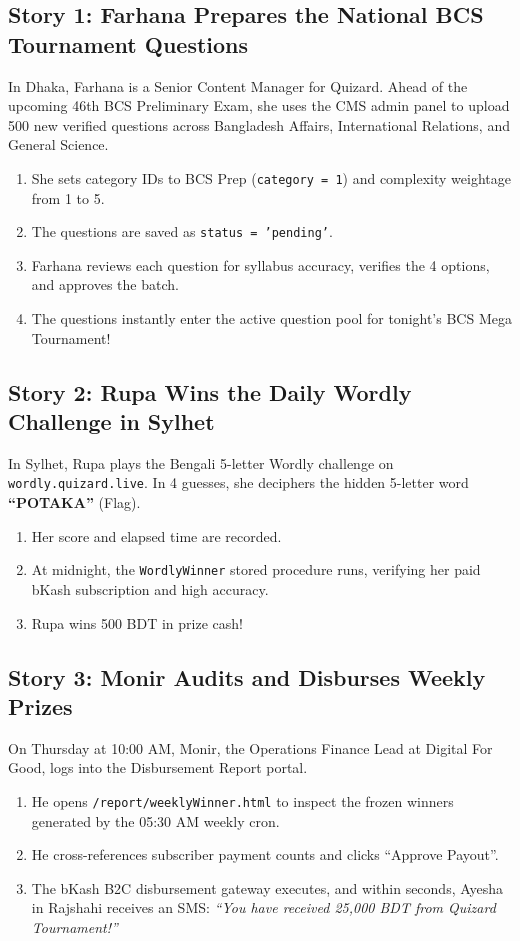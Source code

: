 \subsection{Story 1: Farhana Prepares the National BCS Tournament Questions}
In Dhaka, Farhana is a Senior Content Manager for Quizard. Ahead of the upcoming 46th BCS Preliminary Exam, she uses the CMS admin panel to upload 500 new verified questions across Bangladesh Affairs, International Relations, and General Science.

\begin{enumerate}
    \item She sets category IDs to BCS Prep (\texttt{category = 1}) and complexity weightage from 1 to 5.
    \item The questions are saved as \texttt{status = 'pending'}.
    \item Farhana reviews each question for syllabus accuracy, verifies the 4 options, and approves the batch.
    \item The questions instantly enter the active question pool for tonight's BCS Mega Tournament!
\end{enumerate}

\subsection{Story 2: Rupa Wins the Daily Wordly Challenge in Sylhet}
In Sylhet, Rupa plays the Bengali 5-letter Wordly challenge on \texttt{wordly.quizard.live}. In 4 guesses, she deciphers the hidden 5-letter word \textbf{``POTAKA''} (Flag). 

\begin{enumerate}
    \item Her score and elapsed time are recorded.
    \item At midnight, the \texttt{WordlyWinner} stored procedure runs, verifying her paid bKash subscription and high accuracy.
    \item Rupa wins 500 BDT in prize cash!
\end{enumerate}

\subsection{Story 3: Monir Audits and Disburses Weekly Prizes}
On Thursday at 10:00 AM, Monir, the Operations Finance Lead at Digital For Good, logs into the Disbursement Report portal. 

\begin{enumerate}
    \item He opens \texttt{/report/weeklyWinner.html} to inspect the frozen winners generated by the 05:30 AM weekly cron.
    \item He cross-references subscriber payment counts and clicks ``Approve Payout''.
    \item The bKash B2C disbursement gateway executes, and within seconds, Ayesha in Rajshahi receives an SMS: \textit{``You have received 25,000 BDT from Quizard Tournament!''}
\end{enumerate}

